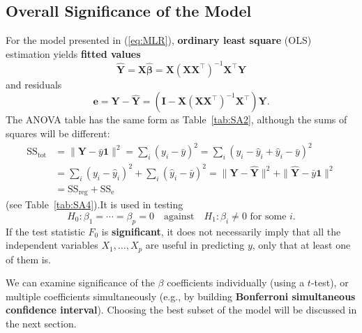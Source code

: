 \subsection{Overall Significance of the Model}
For the model presented in (\ref{eq:MLR}), \textbf{ordinary least square} (OLS) estimation yields \textbf{fitted values} $$\bm{\hat{Y}}=\bm{X\hat{\beta}}=\bm{X}(\bm{XX}^{\!\top})^{-1}\bm{X}^{\!\top}\bm{Y}$$ and residuals $$\bm{e}=\bm{Y}-\bm{\hat{Y}}=(\bm{I}-\bm{X}(\bm{XX}^{\!\top})^{-1}\bm{X}^{\!\top})\bm{Y}.$$ The ANOVA table has the same form as Table~\ref{tab:SA2}, although the sums of squares will be different: \begin{align*}
   \text{SS}_{\textrm{tot}}&=\|\bm{Y}-\bar{y}\bm{1}\|^2=\sum_{i}(y_{i}-\bar{y})^{2}=\sum_{i}(y_{i}-\hat{y}_i+\hat{y}_i-\bar{y})^{2}\\
    &=\sum_{i}(y_i-\hat{y}_{i})^{2}+\sum_{i}(\hat{y}_{i}-\bar{y})^2=\|\bm{Y}-\bm{\hat{Y}}\|^2+\|\bm{\hat{Y}}-\bar{y}\bm{1}\|^2\\&=\text{SS}_{\textrm{reg}}+\text{SS}_{\textrm{e}}
\end{align*}
(see Table~\ref{tab:SA4}).\newpage\noindent It is used in testing $$H_{0}: \beta_{1} = \cdots = \beta_{p}=0\quad\mbox{against}\quad H_{1}: \beta_{i} \neq 0 \text{ for some  } i.$$ If the test statistic $F_{0}$ is \textbf{significant}, it does not necessarily imply that all the independent variables $X_1, \ldots, X_p$ are useful in predicting $y$, only that at least one of them is. \par We can examine significance of the $\beta$ coefficients individually (using a $t$-test), or multiple coefficients simultaneously (e.g., by building \textbf{Bonferroni simultaneous confidence interval}). Choosing the best subset of the model will be discussed in the next section.

